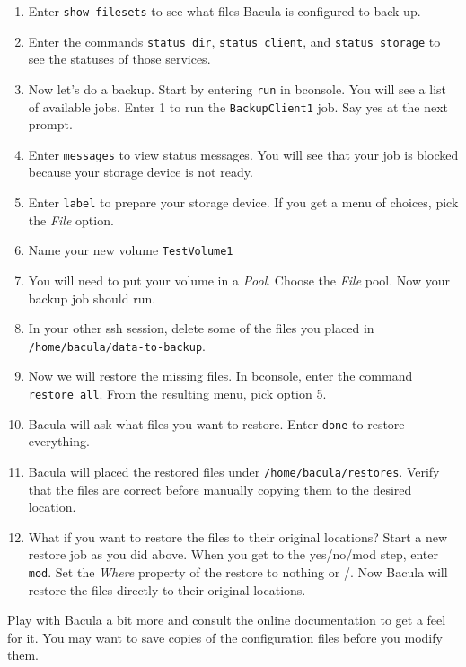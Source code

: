 \documentclass{article}   	%
\begin{document}
\begin{enumerate}
  \item Enter \texttt{show filesets} to see what files Bacula is configured to back up.

  \item Enter the commands \texttt{status dir}, \texttt{status client}, and \texttt{status storage} to see the statuses of those services.

  \item Now let's do a backup.  Start by entering \texttt{run} in bconsole.  You will see a list of available jobs.  Enter 1 to run the 
        \texttt{BackupClient1} job.  Say yes at the next prompt.

  \item Enter \texttt{messages} to view status messages.  You will see that your job is blocked because your storage device is not ready.

  \item Enter \texttt{label} to prepare your storage device. If you get a menu of choices, pick the \emph{File} option.

  \item Name your new volume \texttt{TestVolume1}

  \item You will need to put your volume in a \emph{Pool}.  Choose the \emph{File} pool.  Now your backup job should run.

  \item In your other ssh session, delete some of the files you placed in \texttt{/home/bacula/data-to-backup}.

  \item Now we will restore the missing files.  In bconsole, enter the command \texttt{restore all}.  From the 
        resulting menu, pick option 5.

  \item Bacula will ask what files you want to restore.  Enter \texttt{done} to restore everything.

  \item Bacula will placed the restored files under \texttt{/home/bacula/restores}.  Verify that the files are correct
        before manually copying them to the desired location.

  \item What if you want to restore the files to their original locations?  Start a new restore job as you did above.
        When you get to the yes/no/mod step, enter \texttt{mod}. Set the \emph{Where} property of the restore to 
	nothing or /.  Now Bacula will restore the files directly to their original locations. 

\end{enumerate}

Play with Bacula a bit more and consult the online documentation to get a feel for it.  You may want to save copies of the configuration files 
before you modify them.
\end{document}
